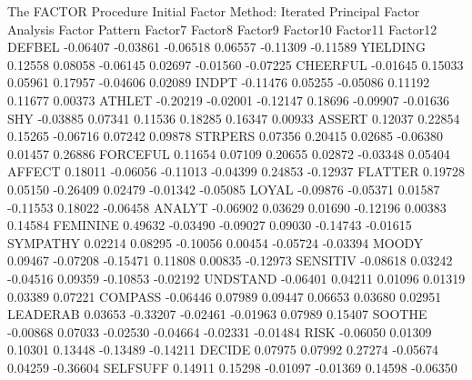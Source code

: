 \documentclass{article}
\begin{document}
\begin{Woutput}
The FACTOR Procedure
Initial Factor Method: Iterated Principal Factor Analysis
                                          Factor Pattern
                Factor7        Factor8        Factor9       Factor10       Factor11       Factor12
DEFBEL         -0.06407       -0.03861       -0.06518        0.06557       -0.11309       -0.11589
YIELDING        0.12558        0.08058       -0.06145        0.02697       -0.01560       -0.07225
CHEERFUL       -0.01645        0.15033        0.05961        0.17957       -0.04606        0.02089
INDPT          -0.11476        0.05255       -0.05086        0.11192        0.11677        0.00373
ATHLET         -0.20219       -0.02001       -0.12147        0.18696       -0.09907       -0.01636
SHY            -0.03885        0.07341        0.11536        0.18285        0.16347        0.00933
ASSERT          0.12037        0.22854        0.15265       -0.06716        0.07242        0.09878
STRPERS         0.07356        0.20415        0.02685       -0.06380        0.01457        0.26886
FORCEFUL        0.11654        0.07109        0.20655        0.02872       -0.03348        0.05404
AFFECT          0.18011       -0.06056       -0.11013       -0.04399        0.24853       -0.12937
FLATTER         0.19728        0.05150       -0.26409        0.02479       -0.01342       -0.05085
LOYAL          -0.09876       -0.05371        0.01587       -0.11553        0.18022       -0.06458
ANALYT         -0.06902        0.03629        0.01690       -0.12196        0.00383        0.14584
FEMININE        0.49632       -0.03490       -0.09027        0.09030       -0.14743       -0.01615
SYMPATHY        0.02214        0.08295       -0.10056        0.00454       -0.05724       -0.03394
MOODY           0.09467       -0.07208       -0.15471        0.11808        0.00835       -0.12973
SENSITIV       -0.08618        0.03242       -0.04516        0.09359       -0.10853       -0.02192
UNDSTAND       -0.06401        0.04211        0.01096        0.01319        0.03389        0.07221
COMPASS        -0.06446        0.07989        0.09447        0.06653        0.03680        0.02951
LEADERAB        0.03653       -0.33207       -0.02461       -0.01963        0.07989        0.15407
SOOTHE         -0.00868        0.07033       -0.02530       -0.04664       -0.02331       -0.01484
RISK           -0.06050        0.01309        0.10301        0.13448       -0.13489       -0.14211
DECIDE          0.07975        0.07992        0.27274       -0.05674        0.04259       -0.36604
SELFSUFF        0.14911        0.15298       -0.01097       -0.01369        0.14598       -0.06350

\end{Woutput}
\end{document}
